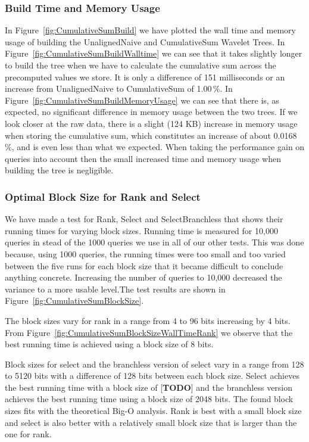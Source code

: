 \subsubsection{Build Time and Memory Usage}
In Figure~\ref{fig:CumulativeSumBuild} we have plotted the wall time and memory usage of building the UnalignedNaive and CumulativeSum Wavelet Trees.
In Figure~\ref{fig:CumulativeSumBuildWalltime} we can see that it takes slightly longer to build the tree when we have to calculate the cumulative sum across the precomputed values we store.
It is only a difference of 151 milliseconds or an increase from UnalignedNaive to CumulativeSum of 1.00\,\%.
In Figure~\ref{fig:CumulativeSumBuildMemoryUsage} we can see that there is, as expected, no significant difference in memory usage between the two trees.
If we look closer at the raw data, there is a slight (124 KB) increase in memory usage when storing the cumulative sum, which constitutes an increase of about 0.0168\,\%, and is even less than what we expected.
When taking the performance gain on queries into account then the small increased time and memory usage when building the tree is negligible.


\subsubsection{Optimal Block Size for Rank and Select}
\label{sec:OptimalBlockSizeForRankAndSelect}
We have made a test for Rank, Select and SelectBranchless that shows their running times for varying block sizes.
Running time is measured for 10,000 queries in stead of the 1000 queries we use in all of our other tests. 
This was done because, using 1000 queries, the running times were too small and too varied between the five runs for each block size that it became difficult to conclude anything concrete. 
Increasing the number of queries to 10,000 decreased the variance to a more usable level.The test results are shown in Figure~\ref{fig:CumulativeSumBlockSize}.

The block sizes vary for rank in a range from 4 to 96 bits increasing by 4 bits.
From Figure~\ref{fig:CumulativeSumBlockSizeWallTimeRank} we observe that the best running time is achieved using a block size of 8 bits. 

Block sizes for select and the branchless version of select vary in a range from 128 to 5120 bits with a difference of 128 bits between each block size. 
Select achieves the best running time with a block size of [\textbf{TODO}] and the branchless version achieves the best running time using a block size of 2048 bits.
The found block sizes fits with the theoretical Big-O analysis.
Rank is best with a small block size and select is also better with a relatively small block size that is larger than the one for rank.


